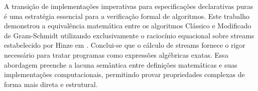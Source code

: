 
A transição de implementações imperativas para especificações declarativas puras é uma estratégia essencial para a verificação formal de algoritmos. Este trabalho demonstrou a equivalência matemática entre os algoritmos Clássico e Modificado de Gram-Schmidt utilizando exclusivamente o raciocínio equacional sobre streams estabelecido por Hinze em \cite{Hinze2010}. Conclui-se que o cálculo de streams fornece o rigor necessário para tratar programas como expressões algébricas exatas. Essa abordagem preenche a lacuna semântica entre definições matemáticas e suas implementações computacionais, permitindo provar propriedades complexas de forma mais direta e estrutural.
